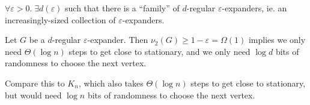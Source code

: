 \documentclass[11pt]{article}
\begin{document}
\begin{theorem}
  $\forall \varepsilon > 0.\; \exists d(\varepsilon)$ such that there is a
  ``family'' of $d$-regular $\varepsilon$-expanders, ie. an increasingly-sized
  collection of $\varepsilon$-expanders.
\end{theorem}

\begin{corollary}
  Let $G$ be a $d$-regular $\varepsilon$-expander. Then $\nu_2(G) \ge 1 -
  \varepsilon = \Omega(1)$ implies we only need $\Theta(\log n)$ steps to get
  close to stationary, and we only need $\log d$ bits of randomness to choose
  the next vertex.

  Compare this to $K_n$, which also takes $\Theta(\log n)$ steps to get close to
  stationary, but would need $\log n$ bits of randomness to choose the next
  vertex.
\end{corollary}
\end{document}
